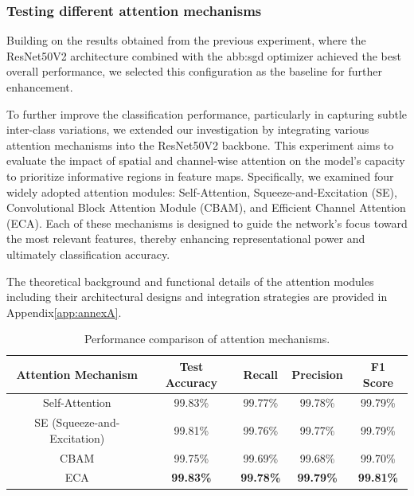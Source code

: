 \vspace{0.5cm}




\subsubsection{Testing different attention mechanisms}
\label{sec:attentionMecanisme}
Building on the results obtained from the previous experiment, where the ResNet50V2 architecture combined with the \gls{abb:sgd} optimizer achieved the best overall performance, we selected this configuration as the baseline for further enhancement.

To further improve the classification performance, particularly in capturing subtle inter-class variations, we extended our investigation by integrating various attention mechanisms into the ResNet50V2 backbone. This experiment aims to evaluate the impact of spatial and channel-wise attention on the model’s capacity to prioritize informative regions in feature maps. Specifically, we examined four widely adopted attention modules: Self-Attention, Squeeze-and-Excitation (SE), Convolutional Block Attention Module (CBAM), and Efficient Channel Attention (ECA). Each of these mechanisms is designed to guide the network’s focus toward the most relevant features, thereby enhancing representational power and ultimately classification accuracy.

The theoretical background and functional details of the attention modules including their architectural designs and integration strategies are provided in Appendix\ref{app:annexA}.


\begin{table}[h!]
\centering
\caption{Performance comparison of attention mechanisms.}
\label{tab:attention_mechanisms}
\begin{tabular}{|c|c|c|c|c|}
\hline
\textbf{Attention Mechanism} & \textbf{Test Accuracy} & \textbf{Recall} & \textbf{Precision} & \textbf{F1 Score} \\
\hline
Self-Attention              & 99.83\% & 99.77\% & 99.78\% & 99.79\% \\
\hline
SE (Squeeze-and-Excitation)& 99.81\% & 99.76\% & 99.77\% & 99.79\% \\
\hline
CBAM                       & 99.75\% & 99.69\% & 99.68\% & 99.70\% \\
\hline
ECA                        & \textbf{99.83\%} & \textbf{99.78\%} & \textbf{99.79\%} & \textbf{99.81\%} \\
\hline
\end{tabular}
\end{table}

